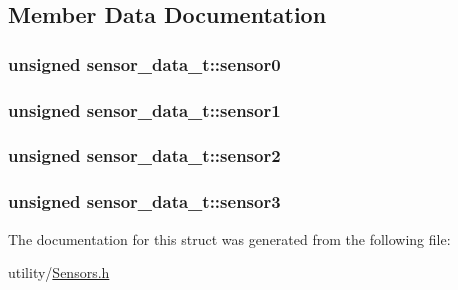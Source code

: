 \subsection{Member Data Documentation}
\hypertarget{structsensor__data__t_a5e3aabb61d03d3fc430ef04510e8e2c9}{
\subsubsection[{sensor0}]{\setlength{\rightskip}{0pt plus 5cm}unsigned sensor\-\_\-data\-\_\-t\-::sensor0}}\label{structsensor__data__t_a5e3aabb61d03d3fc430ef04510e8e2c9}
\hypertarget{structsensor__data__t_a3b5a0377093a58e2274b4a20c32d3a29}{
\subsubsection[{sensor1}]{\setlength{\rightskip}{0pt plus 5cm}unsigned sensor\-\_\-data\-\_\-t\-::sensor1}}\label{structsensor__data__t_a3b5a0377093a58e2274b4a20c32d3a29}
\hypertarget{structsensor__data__t_a59737ac12356411b9dba475e54aed0fb}{
\subsubsection[{sensor2}]{\setlength{\rightskip}{0pt plus 5cm}unsigned sensor\-\_\-data\-\_\-t\-::sensor2}}\label{structsensor__data__t_a59737ac12356411b9dba475e54aed0fb}
\hypertarget{structsensor__data__t_ad0464ebc7e50414c3256cd26f4138258}{
\subsubsection[{sensor3}]{\setlength{\rightskip}{0pt plus 5cm}unsigned sensor\-\_\-data\-\_\-t\-::sensor3}}\label{structsensor__data__t_ad0464ebc7e50414c3256cd26f4138258}


The documentation for this struct was generated from the following file\-:\begin{DoxyCompactItemize}
\item 
utility/\hyperlink{_sensors_8h}{Sensors.\-h}\end{DoxyCompactItemize}
